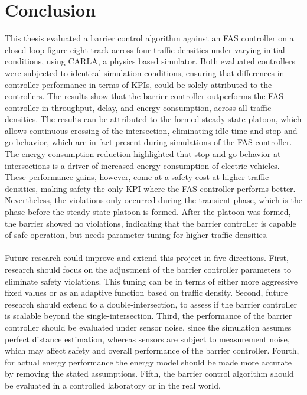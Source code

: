 \section{Conclusion}
\label{Conclusion}
This thesis evaluated a barrier control algorithm against an FAS controller on a closed-loop figure-eight track across four traffic densities under varying initial conditions, using CARLA, a physics based simulator. Both evaluated controllers were subjected to identical simulation conditions, ensuring that differences in controller performance in terms of KPIs, could be solely attributed to the controllers. The results show that the barrier controller outperforms the FAS controller in throughput, delay, and energy consumption, across all traffic densities. The results can be attributed to the formed steady-state platoon, which allows continuous crossing of the intersection, eliminating idle time and stop-and-go behavior, which are in fact present during simulations of the FAS controller. The energy consumption reduction highlighted that stop-and-go behavior at intersections is a driver of increased energy consumption of electric vehicles. 
These performance gains, however, come at a safety cost at higher traffic densities, making safety the only KPI where the FAS controller performs better. Nevertheless, the violations only occurred during the transient phase, which is the phase before the steady-state platoon is formed. After the platoon was formed, the barrier showed no violations, indicating that the barrier controller is capable of safe operation, but needs parameter tuning for higher traffic densities. 
\\\\
Future research could improve and extend this project in five directions. First, research should focus on the adjustment of the barrier controller parameters to eliminate safety violations. This tuning can be in terms of either more aggressive fixed values or as an adaptive function based on traffic density. Second, future research should extend to a double-intersection, to assess if the barrier controller is scalable beyond the single-intersection. Third, the performance of the barrier controller should be evaluated under sensor noise, since the simulation assumes perfect distance estimation, whereas sensors are subject to measurement noise, which may affect safety and overall performance of the barrier controller. Fourth, for actual energy performance the energy model should be made more accurate by removing the stated assumptions. 
Fifth, the barrier control algorithm should be evaluated in a controlled laboratory or in the real world. 
